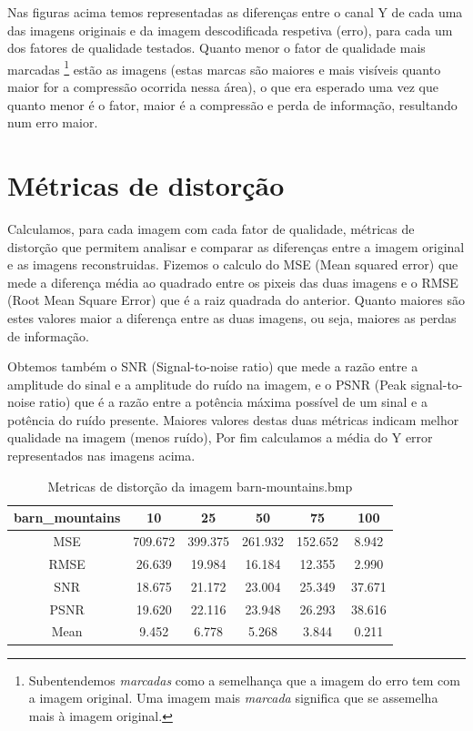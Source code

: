 \documentclass[a4paper, 12pt]{article}
\begin{document}
    Nas figuras acima temos representadas as diferenças
entre o canal Y de cada uma das imagens originais e da imagem descodificada
respetiva (erro), para cada um dos fatores de qualidade testados.
Quanto menor o fator de qualidade mais marcadas \footnote{
Subentendemos \emph{marcadas} como a semelhança que a imagem do erro tem com a imagem original. Uma imagem mais \emph{marcada} significa que se assemelha mais à imagem original.
}
estão as imagens (estas marcas são maiores e mais visíveis quanto maior for a compressão ocorrida nessa área), o que era esperado uma vez que quanto menor é o fator, maior é a compressão e perda de informação, resultando num erro maior.

\section{Métricas de distorção}

Calculamos, para cada imagem com cada fator de qualidade, métricas de distorção que permitem analisar e comparar as diferenças entre a imagem original e as imagens reconstruidas. 
Fizemos o calculo do MSE (Mean squared error) que mede a diferença média ao quadrado entre os pixeis das duas imagens e o RMSE (Root Mean Square Error) que é a raiz quadrada do anterior. Quanto maiores são estes valores maior a diferença entre as duas imagens, ou seja, maiores as perdas de informação.

Obtemos também o SNR (Signal-to-noise ratio) que mede a razão entre a amplitude do sinal e a amplitude do ruído na imagem, e o PSNR (Peak signal-to-noise ratio) que é a razão entre a potência máxima possível de um sinal e a potência do ruído presente. Maiores valores destas duas métricas indicam melhor qualidade na imagem (menos ruído), 
Por fim calculamos a média do Y error representados nas imagens acima. 

    \begin{table}[H]
            \centering
            \begin{tabular}{||c | c c c c c||} 
                \hline
                barn\_mountains & 10 & 25 & 50 & 75 & 100 \\ 
                \hline\hline
                MSE &  709.672 &  399.375 & 261.932 & 152.652 & 8.942 \\
                RMSE & 26.639 &  19.984 &   16.184  & 12.355  & 2.990 \\
                SNR &  18.675 &  21.172 &  23.004  & 25.349  & 37.671 \\
                PSNR & 19.620 &  22.116 &   23.948 & 26.293  & 38.616\\
                Mean &  9.452 &  6.778 &  5.268  &  3.844 & 0.211 \\
                \hline
            \end{tabular}
            \caption{\label{demo-table} Metricas de distorção da imagem barn-mountains.bmp}
        \end{table}
\end{document}
